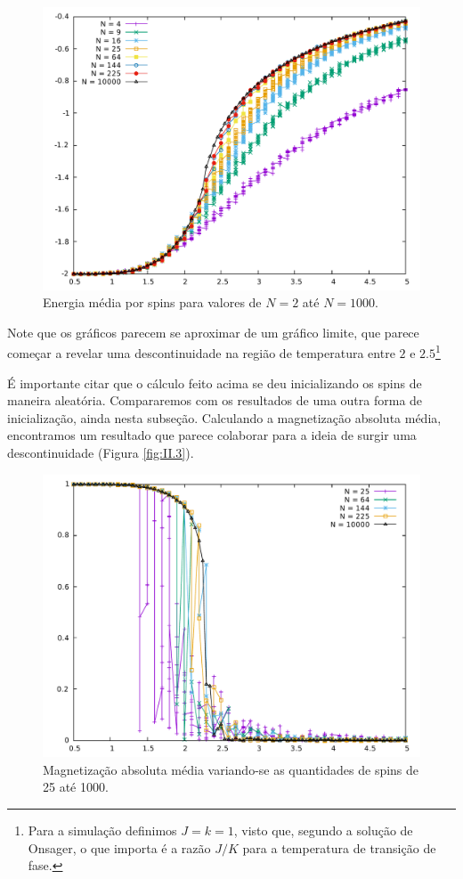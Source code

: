 \begin{figure}[h]
	\center
	\includegraphics[scale=.35]{Energy.pdf}
	\caption{Energia média por spins para valores de $N=2$ até $N = 1000$.}
	\label{fig:II.2}
\end{figure}

Note que os gráficos parecem se aproximar de um gráfico limite, que parece começar a revelar uma descontinuidade na região de temperatura entre $2$ e $2.5$\footnote{Para a simulação definimos $J = k = 1$, visto que, segundo a solução de Onsager, o que importa é a razão $J/K$ para a temperatura de transição de fase.}

É importante citar que o cálculo feito acima se deu inicializando os spins de maneira aleatória. Compararemos com os resultados de uma outra forma de inicialização, ainda nesta subseção. Calculando a magnetização absoluta média, encontramos um resultado que parece colaborar para a ideia de surgir uma descontinuidade (Figura \ref{fig:II.3}).

\begin{figure}[h]
	\center
	\includegraphics[scale=.35]{Magnetization.pdf}
	\caption{Magnetização absoluta média variando-se as quantidades de spins de 25 até 1000.}
\end{figure}

